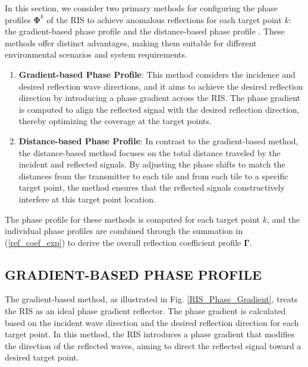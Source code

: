 \documentclass{IEEEoj}
\begin{document}
In this section, we consider two primary methods for configuring the phase profiles $\mathbf{\Phi}^k$ of the RIS to achieve anomalous reflections for each target point $k$: the gradient-based phase profile \cite{phase_grad_paper} and the distance-based phase profile \cite{Tang}. These methods offer distinct advantages, making them suitable for different environmental scenarios and system requirements.

\begin{enumerate}
	\item \textbf{Gradient-based Phase Profile}: This method considers the incidence and desired reflection wave directions, and it aims to achieve the desired reflection direction by introducing a phase gradient across the RIS. The phase gradient is computed to align the reflected signal with the desired reflection direction, thereby optimizing the coverage at the target points.
	
	\item \textbf{Distance-based Phase Profile}: In contrast to the gradient-based method, the distance-based method focuses on the total distance traveled by the incident and reflected signals. By adjusting the phase shifts to match the distances from the transmitter to each tile and from each tile to a specific target point, the method ensures that the reflected signals constructively interfere at this target point location.
\end{enumerate}

The phase profile for these methods is computed for each target point $k$, and the individual phase profiles are combined through the summation in (\ref{ref_coef_exp}) to derive the overall reflection coefficient profile $\mathbf{\Gamma}$.

\subsection{GRADIENT-BASED PHASE PROFILE}
The gradient-based method, as illustrated in Fig. \ref{RIS_Phase_Gradient}, treats the RIS as an ideal phase gradient reflector. The phase gradient is calculated based on the incident wave direction and the desired reflection direction for each target point. In this method, the RIS introduces a phase gradient that modifies the direction of the reflected waves, aiming to direct the reflected signal toward a desired target point.
\end{document}
